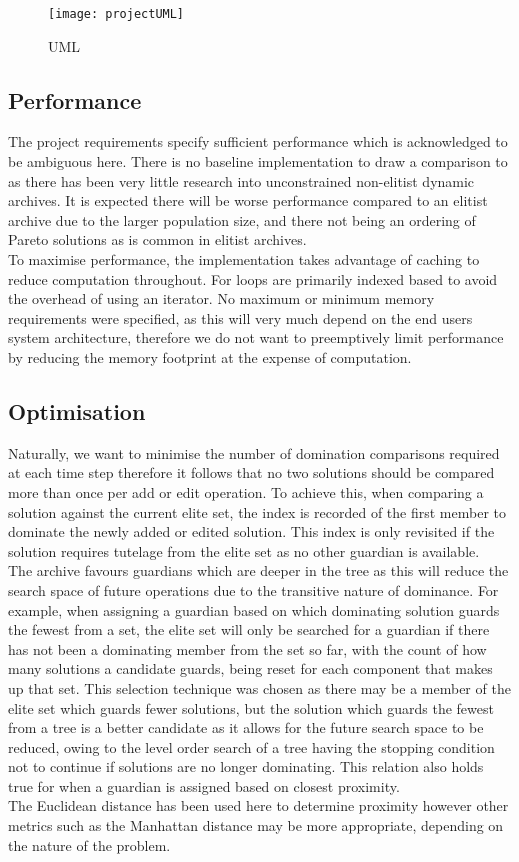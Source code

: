 \documentclass{ecmm427_assignment}
\begin{document}
\begin{figure}[h!]
    \centering
    \texttt{[image: projectUML]}
    \caption{UML}
    \label{fig:Class Diagram}
\end{figure}

\subsection{Performance}
The project requirements specify sufficient performance which is acknowledged to be ambiguous here. There is no baseline implementation to draw a comparison to as there has been very little research into unconstrained non-elitist dynamic archives. It is expected there will be worse performance compared to an elitist archive due to the larger population size, and there not being an ordering of Pareto solutions as is common in elitist archives.
\\To maximise performance, the implementation takes advantage of caching to reduce computation throughout. For loops are primarily indexed based to avoid the overhead of using an iterator. No maximum or minimum memory requirements were specified, as this will very much depend on the end users system architecture, therefore we do not want to preemptively limit performance by reducing the memory footprint at the expense of computation.

\subsection{Optimisation}
Naturally, we want to minimise the number of domination comparisons required at each time step therefore it follows that no two solutions should be compared more than once per add or edit operation. To achieve this, when comparing a solution against the current elite set, the index is recorded of the first member to dominate the newly added or edited solution. This index is only revisited if the solution requires tutelage from the elite set as no other guardian is available.
\\The archive favours guardians which are deeper in the tree as this will reduce the search space of future operations due to the transitive nature of dominance. For example, when assigning a guardian based on which dominating solution guards the fewest from a set, the elite set will only be searched for a guardian if there has not been a dominating member from the set so far, with the count of how many solutions a candidate guards, being reset for each component that makes up that set. This selection technique was chosen as there may be a member of the elite set which guards fewer solutions, but the solution which guards the fewest from a tree is a better candidate as it allows for the future search space to be reduced, owing to the level order search of a tree having the stopping condition not to continue if solutions are no longer dominating. This relation also holds true for when a guardian is assigned based on closest proximity.
\\The Euclidean distance has been used here to determine proximity however other metrics such as the Manhattan distance may be more appropriate, depending on the nature of the problem.
\end{document}
